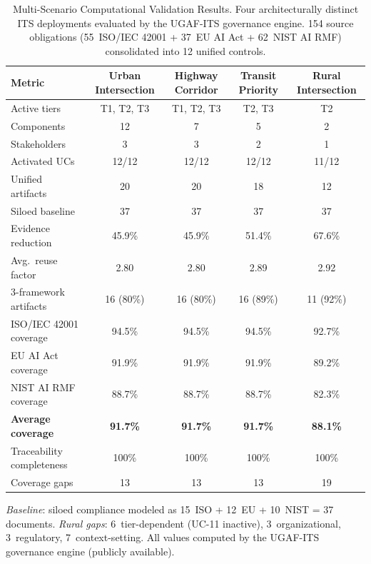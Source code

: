 \begin{table}[t]
\centering
\caption{Multi-Scenario Computational Validation Results. Four
architecturally distinct ITS deployments evaluated by the UGAF-ITS
governance engine. 154 source obligations (55~ISO/IEC 42001 +
37~EU AI Act + 62~NIST AI RMF) consolidated into 12 unified controls.}
\label{tab:multi_scenario_results}
\renewcommand{\arraystretch}{1.15}
\setlength{\tabcolsep}{4pt}
\begin{tabular}{l c c c c}
\hline
\textbf{Metric}
  & \textbf{Urban Intersection}
  & \textbf{Highway Corridor}
  & \textbf{Transit Priority}
  & \textbf{Rural Intersection} \\
\hline
Active tiers
  & T1, T2, T3 & T1, T2, T3 & T2, T3 & T2 \\
Components
  & 12 & 7 & 5 & 2 \\
Stakeholders
  & 3 & 3 & 2 & 1 \\
\hline
Activated UCs
  & 12/12 & 12/12 & 12/12 & 11/12 \\
Unified artifacts
  & 20 & 20 & 18 & 12 \\
Siloed baseline
  & 37 & 37 & 37 & 37 \\
Evidence reduction
  & 45.9\% & 45.9\% & 51.4\% & 67.6\% \\
Avg.\ reuse factor
  & 2.80 & 2.80 & 2.89 & 2.92 \\
3-framework artifacts
  & 16 (80\%) & 16 (80\%) & 16 (89\%) & 11 (92\%) \\
\hline
ISO/IEC 42001 coverage
  & 94.5\% & 94.5\% & 94.5\% & 92.7\% \\
EU AI Act coverage
  & 91.9\% & 91.9\% & 91.9\% & 89.2\% \\
NIST AI RMF coverage
  & 88.7\% & 88.7\% & 88.7\% & 82.3\% \\
\textbf{Average coverage}
  & \textbf{91.7\%} & \textbf{91.7\%} & \textbf{91.7\%} & \textbf{88.1\%} \\
\hline
Traceability completeness
  & 100\% & 100\% & 100\% & 100\% \\
Coverage gaps
  & 13 & 13 & 13 & 19 \\
\hline
\end{tabular}
\begin{tablenotes}\footnotesize
\item \textit{Baseline}: siloed compliance modeled as 15~ISO + 12~EU + 10~NIST = 37 documents.
\textit{Rural gaps}: 6~tier-dependent (UC-11 inactive), 3~organizational, 3~regulatory, 7~context-setting.
All values computed by the UGAF-ITS governance engine (publicly available).
\end{tablenotes}
\end{table}



